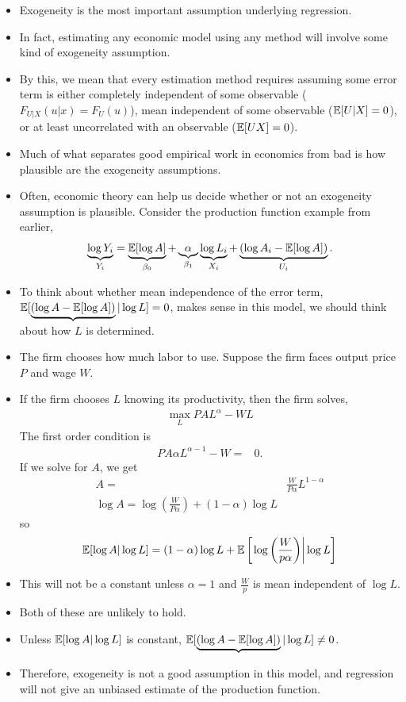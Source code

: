 \begin{frame}[allowframebreaks]
\framebreak

\begin{itemize}
\item Exogeneity is the most important assumption underlying
  regression. 
\item In fact, estimating any economic model using any method will involve some
kind of exogeneity assumption. 
\item By this, we mean that every estimation
method requires assuming some error term is either completely
independent of some observable ($F_{U|X}(u|x) =
F_U(u)$), mean independent of some observable
($\mathbb{E}[U|X] = 0$), or at least uncorrelated with an observable
($\mathbb{E}[U X] = 0$). 
\item Much of what separates good empirical work in
economics from bad is how plausible are the exogeneity
assumptions. 
\item Often, economic theory can help us decide whether or
not an exogeneity assumption is plausible. Consider the 
production function example from earlier, 
\[ \underbrace{\log Y_i}_{Y_i} = \underbrace{\mathbb{E}[\log A]}_{\beta_0}
+ \underbrace{\alpha}_{\beta_1} \underbrace{\log L_i}_{X_i} +
\underbrace{(\log{A}_i - \mathbb{E}[\log A])}_{U_i}. \]
\item To think about whether mean independence of the error term,
$\mathbb{E}[\underbrace{(\log{A} - \mathbb{E}[\log A])}|\log L]=0$, makes sense in
this model, we should think about how $L$ is determined. 
\item The firm
chooses how much labor to use. Suppose the firm faces output price $P$
and wage $W$. 
\item If the firm chooses $L$ knowing its productivity, then
the firm solves,
\begin{align*}
   \max_L P A L^\alpha - WL 
\end{align*}
The first order condition is 
\begin{align*}
  P A \alpha L^{\alpha -1} - W = & 0.
\end{align*}
If we solve for $A$, we get
\begin{align*}
  A = & \frac{W}{P \alpha } L^{1-\alpha} \\
  \log A = \log\left(\frac{W}{P \alpha }\right) + (1-\alpha) \log L
\end{align*}
so
\begin{align*}
  \mathbb{E}[ \log A | \log L ] =  (1-\alpha) \log L +
  \mathbb{E}\left[\left . \log\left(\frac{W}{p \alpha }\right) \right| \log L
  \right] 
\end{align*}
\item This will not be a constant unless $\alpha = 1$ and $\frac{W}{p}$ is
mean independent of $\log L$. 
\item Both of these are unlikely to
hold. 
\item Unless $\mathbb{E}[ \log A | \log L ] $ is constant,
$\mathbb{E}[\underbrace{(\log{A} - \mathbb{E}[\log A])}|\log L] \neq 0$.  
\item Therefore,
exogeneity is not a good assumption in this model, and regression will
not give an unbiased estimate of the production function. 

\end{itemize}
\end{frame}

